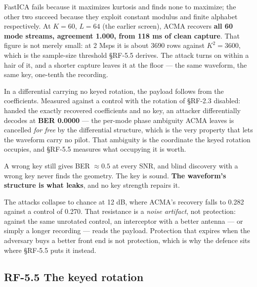 \documentclass[10pt,letterpaper,twocolumn]{article}
\begin{document}

FastICA fails because it maximizes kurtosis and finds none to maximize; the other two succeed because they exploit constant modulus and finite alphabet respectively. At \(K=60\), \(L=64\) (the earlier screen), ACMA recovers \textbf{all 60 mode streams, agreement 1.000, from 118 ms of clean capture}. That figure is not merely small: at 2 Msps it is about 3690 rows against \(K^2 = 3600\), which is the sample-size threshold §RF-5.5 derives. The attack turns on within a hair of it, and a shorter capture leaves it at the floor --- the same waveform, the same key, one-tenth the recording.

In a differential carrying no keyed rotation, the payload follows from the coefficients. Measured against a control with the rotation of §RF-2.3 disabled: handed the exactly recovered coefficients and no key, an attacker differentially decodes at \textbf{BER 0.0000} --- the per-mode phase ambiguity ACMA leaves is cancelled \emph{for free} by the differential structure, which is the very property that lets the waveform carry no pilot. That ambiguity is the coordinate the keyed rotation occupies, and §RF-5.5 measures what occupying it is worth.

A wrong key still gives BER \(\approx 0.5\) at every SNR, and blind discovery with a wrong key never finds the geometry. The key is sound. \textbf{The waveform's structure is what leaks}, and no key strength repairs it.

The attacks collapse to chance at 12 dB, where ACMA's recovery falls to 0.282 against a control of 0.270. That resistance is a \emph{noise artifact}, not protection: against the same unrotated control, an interceptor with a better antenna --- or simply a longer recording --- reads the payload. Protection that expires when the adversary buys a better front end is not protection, which is why the defence sits where §RF-5.5 puts it instead.

\subsection{RF-5.5 The keyed rotation}\label{rf-55-the-keyed-rotation}
\end{document}
